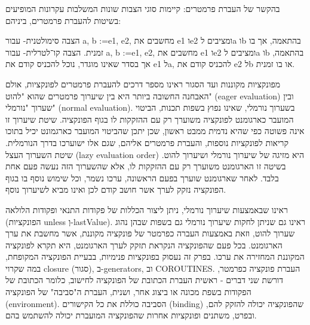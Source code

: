         בהקשר של העברת פרמטרים:
        קיימות סוגי הצבות שונות המשלבות עקרונות המופיעים בשיטות להעברת פרמטרים, ביניהם:

        הצבה סימולטנית- עבור a, b :=e1, e2, מחשבים את e1 וe2 ומציבים לa וb בהתאמה, אך בו זמנית.
        הצבה קו־לטרלית- עבור a, b :=e1, e2, מחשבים את e1 וe2 ומציבים לa וb בהתאמה, אך בסדר שאינו מוגדר, נוכל להכניס קודם את e1 לa, להכניס קודם את e2 לb או בו זמנית.

        מפונקציות מקוננות ועד הסגור
        ראינו מספר דרכים להעברת פרמטרים לפונקציות, אולם האבחנה החשובה ביותר היא בין
        שיערוך פרמטרים שהוא "להוט" (eager evaluation) ובין שערוך "נורמלי" (normal
        evaluation). בשערוך נורמלי, שאינו נפוץ בשפות תכנות, הביטוי המועבר כארגומנט
        לפונקציה משוערך רק עם ההזקקות לו בגוף הפונקציה. שיטת שיערוך זו אינה פשוטה כפי
        שהיא נדמית ממבט ראשון, שכן יתכן שהביטוי המועבר כארגמונט יכיל בתוכו קריאות
        לפונקציות נוספות, והעברת פרמטרים אליהם, שגם אלו ישוערכו בדרך הנורמלית. שיטת
        השערוך העצל (lazy evaluation order) היא מזיגה של שיערוך נורמלי ושיערוך להוט.
        בשיטה זו הארגומנט משוערך רק עם ההזקקות לו, אלא שהשערוך הזה נעשה פעם אחת בלבד.
        לאחר שארגומנט שוערך בפעם הראשונה, ערכו נשמר, וכל שימוש נוסף בו בגוף הפונקציה
        נזקק לערך אשר חושב קודם לכן ואינו מביא לשיערוך נוסף.

        ראינו שבאמצעות שיערוך נורמלי, ניתן ליצור הכללות של פקודות התנאי ופקודות הלולאה
        (הפונקציות unless וְ-lastValue). ראינו גם שניתן לחקות שיערוך נורמלי גם בשפות
        שבהן נהוג שערוך להוט, וזאת באמצעות העברה כפרמטר של פונקציה מקוננת, אשר מחשבת את
        ערך הארגומנט. בכל פעם שהפונקציה הנקראת תזקק לערך הארגומנט, היא תקרא לפונקציה
        המקוננת המחזירה את ערכו. בפרק זה נעסוק בפונקציות פנימיות, בבעיית הפונקציה
        המקופחת, במה שקרוי closure (סגור), ב-generators, וב COROUTINES.
        העברת פונקציה כפרמטר, דורשת שני דברים - ראשית העברת הכתובת של הפונקציה לחישוב, כלומר הכתובת של הפקודות בשפת מכונה או ביצוג אחר, ושנית, העברת ה"סביבה" של הפונקציה (environment). הסביבה כוללת את כל הקישורים (binding) שהפונקציה יכולה להזקק להם, ובפרט, משתנים ופונקציות אחרות שהפונקציה המועברת יכולה להשתמש בהם.

